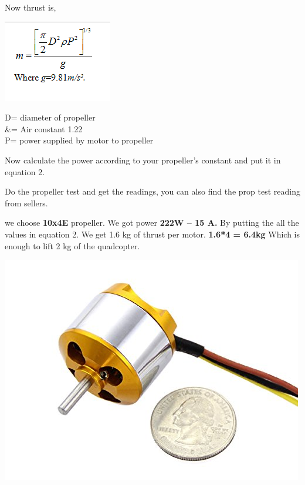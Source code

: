 \documentclass{article}
\begin{document}
 \large
 Now thrust is,
 \begin{center}
 
 		\includegraphics{eq1}
 \end{center}
 \begin{flushleft}
 	D= diameter of propeller \\
 	 &\X\rho     = Air constant 1.22\\
 	P= power supplied by motor to propeller\newline
 	
 	 Now calculate the power according to your propeller’s constant and put it in equation 2.\newline
 	
 	Do the propeller test and get the readings, you can also find the prop test reading from sellers. \newline
 	
 	we choose \textbf{10x4E} propeller. We got power \textbf{222W – 15 A.}
 	By putting the all the values in equation 2. We  get 1.6 kg of thrust per motor.
 	\textbf{1.6*4 = 6.4kg} Which is enough to lift 2 kg of the quadcopter.\newline
 	\newline
 	
 
 		\includegraphics[width = 200 px]{motor}
 	
 	
 \end{flushleft}
\end{document}
